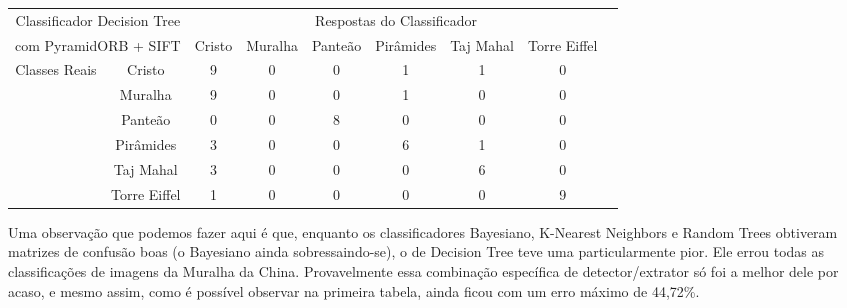 \documentclass[a4paper,11pt]{article}
\begin{document}
  \hspace{-75pt}
  \begin{tabular}{|cc|c|c|c|c|c|c|c|}
    \hline
    \multicolumn{2}{|c|}{Classificador Decision Tree} &
    \multicolumn{6}{|c|}{Respostas do Classificador} \\
    \cline{3-8}
    \multicolumn{2}{|c|}{com PyramidORB + SIFT}
    & Cristo & Muralha & Panteão & Pirâmides & Taj Mahal & Torre Eiffel \\
    \hline
    \multirow{6}{*}{Classes Reais}
    & \multicolumn{1}{|c|}{Cristo} & 9 & 0 & 0 & 1 & 1 & 0 \\
    \cline{2-8}
    & \multicolumn{1}{|c|}{Muralha} & 9 & 0 & 0 & 1 & 0 & 0\\
    \cline{2-8}
    & \multicolumn{1}{|c|}{Panteão} & 0 & 0 & 8 & 0 & 0 & 0\\
    \cline{2-8}
    & \multicolumn{1}{|c|}{Pirâmides} & 3 & 0 & 0 & 6 & 1 & 0\\
    \cline{2-8}
    & \multicolumn{1}{|c|}{Taj Mahal} & 3 & 0 & 0 & 0 & 6 & 0\\
    \cline{2-8}
    & \multicolumn{1}{|c|}{Torre Eiffel} & 1 & 0 & 0 & 0 & 0 & 9\\
    \hline
  \end{tabular}
  \vspace{20pt}

  Uma observação que podemos fazer aqui é que, enquanto os classificadores
  Bayesiano, K-Nearest Neighbors e Random Trees obtiveram matrizes de confusão
  boas (o Bayesiano ainda sobressaindo-se), o de Decision Tree teve uma
  particularmente pior. Ele errou todas as classificações de imagens da Muralha
  da China. Provavelmente essa combinação específica de detector/extrator só foi
  a melhor dele por acaso, e mesmo assim, como é possível observar na primeira
  tabela, ainda ficou com um erro máximo de 44,72\%.
\end{document}
